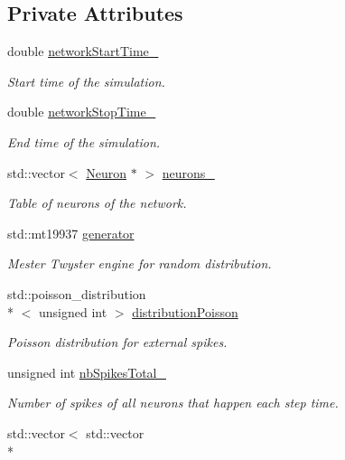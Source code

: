 \subsection*{Private Attributes}
\begin{DoxyCompactItemize}
\item 
double \hyperlink{classNetwork_ad07d3a8419cece935015b1b61c09912b}{network\-Start\-Time\-\_\-}
\begin{DoxyCompactList}\small\item\em Start time of the simulation. \end{DoxyCompactList}\item 
double \hyperlink{classNetwork_ad0eb983a5fb38dd9ab4d37db43ea9776}{network\-Stop\-Time\-\_\-}
\begin{DoxyCompactList}\small\item\em End time of the simulation. \end{DoxyCompactList}\item 
std\-::vector$<$ \hyperlink{classNeuron}{Neuron} $\ast$ $>$ \hyperlink{classNetwork_ad5054ddd778795d5ceaac9e6adf050cd}{neurons\-\_\-}
\begin{DoxyCompactList}\small\item\em Table of neurons of the network. \end{DoxyCompactList}\item 
std\-::mt19937 \hyperlink{classNetwork_a248c1c21424237413df17ba518c61f31}{generator}
\begin{DoxyCompactList}\small\item\em Mester Twyster engine for random distribution. \end{DoxyCompactList}\item 
std\-::poisson\-\_\-distribution\\*
$<$ unsigned int $>$ \hyperlink{classNetwork_a41d662a681a79785a86849fdc0a1657f}{distribution\-Poisson}
\begin{DoxyCompactList}\small\item\em Poisson distribution for external spikes. \end{DoxyCompactList}\item 
unsigned int \hyperlink{classNetwork_a22d94d85ea0c01409d600907976ab699}{nb\-Spikes\-Total\-\_\-}
\begin{DoxyCompactList}\small\item\em Number of spikes of all neurons that happen each step time. \end{DoxyCompactList}\item 
std\-::vector$<$ std\-::vector\\*

\end{DoxyCompactItemize}
